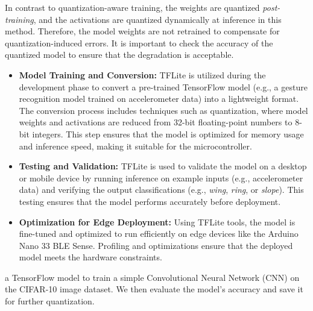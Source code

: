 In contrast to quantization-aware training, the weights are quantized \textit{post-training}, and the activations are quantized dynamically at inference in this method. Therefore, the model weights are not retrained to compensate for quantization-induced errors. It is important to check the accuracy of the quantized model to ensure that the degradation is acceptable.\cite{tensorflowlite:2025}

\begin{itemize}
	\item \textbf{Model Training and Conversion:}
	TFLite is utilized during the development phase to convert a pre-trained TensorFlow model (e.g., a gesture recognition model trained on accelerometer data) into a lightweight format. The conversion process includes techniques such as quantization, where model weights and activations are reduced from 32-bit floating-point numbers to 8-bit integers. This step ensures that the model is optimized for memory usage and inference speed, making it suitable for the microcontroller.\cite{tensorflowlite:2025}
	
	\item \textbf{Testing and Validation:}
	TFLite is used to validate the model on a desktop or mobile device by running inference on example inputs (e.g., accelerometer data) and verifying the output classifications (e.g., \textit{wing}, \textit{ring}, or \textit{slope}). This testing ensures that the model performs accurately before deployment.
	
	\item \textbf{Optimization for Edge Deployment:}
	Using TFLite tools, the model is fine-tuned and optimized to run efficiently on edge devices like the Arduino Nano 33 BLE Sense. Profiling and optimizations ensure that the deployed model meets the hardware constraints.\cite{tensorflowlite:2025}
\end{itemize}
a TensorFlow model to train a simple Convolutional Neural Network (CNN) on the CIFAR-10 image dataset. We then evaluate the model's accuracy and save it for further quantization.

